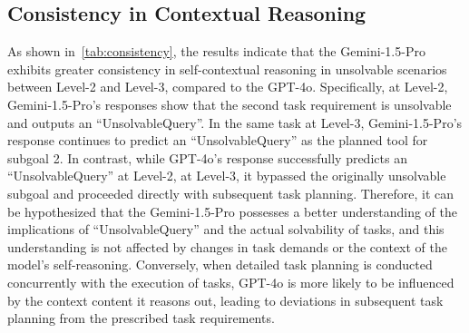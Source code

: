 \documentclass[11pt]{article}
\begin{document}
\subsection{Consistency in Contextual Reasoning}
\label{append:ss:consistency}

As shown in~\cref{tab:consistency}, the results indicate that the Gemini-1.5-Pro exhibits greater consistency in self-contextual reasoning in unsolvable scenarios between Level-2 and Level-3, compared to the GPT-4o. 
Specifically, at Level-2, Gemini-1.5-Pro's responses show that the second task requirement is unsolvable and outputs an ``UnsolvableQuery''. 
In the same task at Level-3, Gemini-1.5-Pro's response continues to predict an ``UnsolvableQuery'' as the planned tool for subgoal 2. 
In contrast, while GPT-4o's response successfully predicts an ``UnsolvableQuery'' at Level-2, at Level-3, it bypassed the originally unsolvable subgoal and proceeded directly with subsequent task planning.
Therefore, it can be hypothesized that the Gemini-1.5-Pro possesses a better understanding of the implications of ``UnsolvableQuery'' and the actual solvability of tasks, and this understanding is not affected by changes in task demands or the context of the model's self-reasoning.
Conversely, when detailed task planning is conducted concurrently with the execution of tasks, GPT-4o is more likely to be influenced by the context content it reasons out, leading to deviations in subsequent task planning from the prescribed task requirements.




















\end{document}
